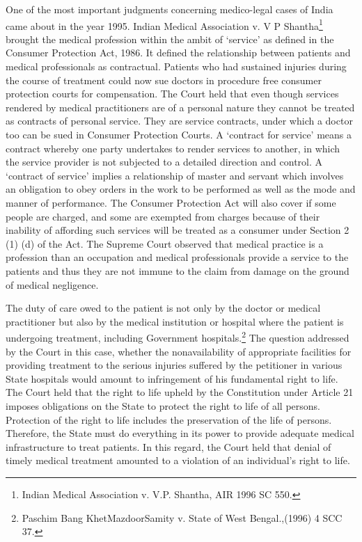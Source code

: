 \begin{multicols}{2}
\noi
One of the most important judgments concerning medico-legal cases of India came about in the
year 1995. Indian Medical Association v. V P Shantha\footnote{Indian Medical Association v. V.P. Shantha, AIR 1996 SC 550.} brought the medical profession within the ambit of ‘service’ as defined in the Consumer Protection Act, 1986. It defined the relationship
between patients and medical professionals as contractual. Patients who had sustained injuries
during the course of treatment could now sue doctors in procedure free consumer protection
courts for compensation. The Court held that even though services rendered by medical
practitioners are of a personal nature they cannot be treated as contracts of personal service. They are service contracts, under which a doctor too can be sued in Consumer Protection Courts. A
‘contract for service’ means a contract whereby one party undertakes to render services to another,
in which the service provider is not subjected to a detailed direction and control. A ‘contract of
service’ implies a relationship of master and servant which involves an obligation to obey orders
in the work to be performed as well as the mode and manner of performance. The Consumer
Protection Act will also cover if some people are charged, and some are exempted from charges
because of their inability of affording such services will be treated as a consumer under Section
2 (1) (d) of the Act. The Supreme Court observed that medical practice is a profession than an
occupation and medical professionals provide a service to the patients and thus they are not
immune to the claim from damage on the ground of medical negligence.

\vspace{-.12cm}


\vspace{-.12cm}

\noi
The duty of care owed to the patient is not only by the doctor or medical practitioner but also by
the medical institution or hospital where the patient is undergoing treatment, including
Government hospitals.\footnote{Paschim Bang KhetMazdoorSamity v. State of West Bengal.,(1996) 4 SCC 37.} The question addressed by the Court in this case, whether the nonavailability of appropriate facilities for providing treatment to the serious injuries suffered by the
petitioner in various State hospitals would amount to infringement of his fundamental right to
life. The Court held that the right to life upheld by the Constitution under Article 21 imposes
obligations on the State to protect the right to life of all persons. Protection of the right to life
includes the preservation of the life of persons. Therefore, the State must do everything in its
power to provide adequate medical infrastructure to treat patients. In this regard, the Court held
that denial of timely medical treatment amounted to a violation of an individual’s right to life. 


\end{multicols}
